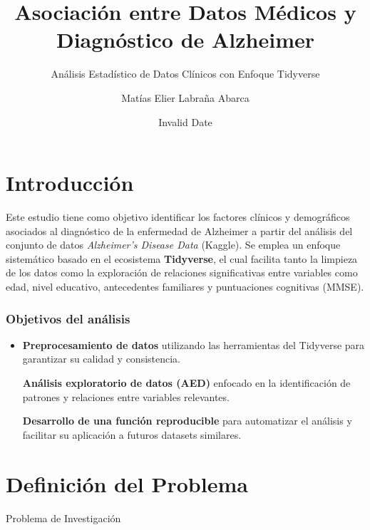 \documentclass[
  letterpaper,
  DIV=11,
  numbers=noendperiod]{scrartcl}
\title{Asociación entre Datos Médicos y Diagnóstico de Alzheimer}
\subtitle{Análisis Estadístico de Datos Clínicos con Enfoque Tidyverse}
\author{Matías Elier Labraña Abarca}
\date{Invalid Date}
\makeatletter
\let\oldparagraph\paragraph
\renewcommand{\paragraph}{
    \@ifstar
      \xxxParagraphStar
      \xxxParagraphNoStar
  }
\newcommand{\xxxParagraphStar}[1]{\oldparagraph*{#1}\mbox{}}
\newcommand{\xxxParagraphNoStar}[1]{\oldparagraph{#1}\mbox{}}
\renewcommand*\contentsname{Table of contents}
\newcommand\contentsname{Table of contents}
\makeatother
\begin{document}
\maketitle

\renewcommand*\contentsname{Table of contents}
{
\hypersetup{linkcolor=}
\setcounter{tocdepth}{3}
\tableofcontents
}

\pagebreak

\section{Introducción}\label{introducciuxf3n}

Este estudio tiene como objetivo identificar los factores clínicos y
demográficos asociados al diagnóstico de la enfermedad de Alzheimer a
partir del análisis del conjunto de datos \emph{Alzheimer's Disease
Data} (Kaggle). Se emplea un enfoque sistemático basado en el ecosistema
\textbf{Tidyverse}, el cual facilita tanto la limpieza de los datos como
la exploración de relaciones significativas entre variables como edad,
nivel educativo, antecedentes familiares y puntuaciones cognitivas
(MMSE).

\subsubsection{Objetivos del análisis}\label{objetivos-del-anuxe1lisis}

\begin{itemize}
\item
  \textbf{Preprocesamiento de datos} utilizando las herramientas del
  Tidyverse para garantizar su calidad y consistencia.

  \textbf{Análisis exploratorio de datos (AED)} enfocado en la
  identificación de patrones y relaciones entre variables relevantes.

  \textbf{Desarrollo de una función reproducible} para automatizar el
  análisis y facilitar su aplicación a futuros datasets similares.
\end{itemize}

\section{Definición del Problema}\label{definiciuxf3n-del-problema}

\paragraph{Problema de
Investigación}\label{problema-de-investigaciuxf3n}
\end{document}
